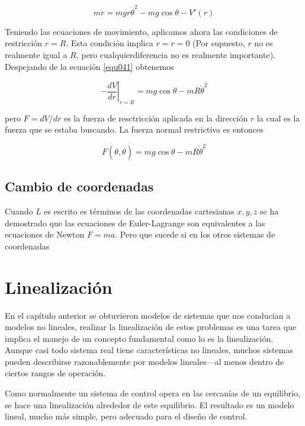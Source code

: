 \documentclass[12pt]{book}
\theoremstyle{definition}
\theoremstyle{remark}
\theoremstyle{plain}
\begin{document}
\begin{equation}
\label{equ041}
m \ddot{r} = m g r \dot{\theta}^2-m g \cos \theta - V'(r)
\end{equation}

Teniendo las ecuaciones de movimiento, aplicamos ahora las condiciones de restricción $r=R$. Esta condición implica $\dot{r}= \ddot{r}=0$  (Por supuesto, $r$ no es realmente igual a $R$, pero cualquierdiferencia no es realmente importante). Despejando de la ecuación \ref{equ041} obtenemos

\begin{equation}
\label{equ042}
\left . - \frac{d V}{d r}  \right | _{r=R} = m g \cos \theta - m R \dot{\theta}^2
\end{equation}

pero $ F = dV / d r$ es la fuerza de resctricción aplicada en la dirección $r$ la cual es la fuerza que se estaba buscando. La fuerza normal restrictiva es entonces

\begin{equation}
\label{equ043}
F (\theta, \dot{\theta} )= m g \cos \theta - m R \dot{\theta}^2
\end{equation}

\section{Cambio de coordenadas}

Cuando $L$ es escrito es términos de las coordenadas cartesianas $x,y,z$  se ha demostrado que las ecuaciones de Euler-Lagrange son equivalentes a las ecuaciones de Newton $F=m a$. Pero que sucede si en los otros sistemas de coordenadas



\chapter{Linealización}

En el capítulo anterior se obtuvieron modelos de sistemas que nos conducian a modelos no lineales, realizar la linealización de estos problemas es una tarea que implica el manejo de un concepto fundamental como lo es la linealización. Aunque casi todo sistema real tiene características no lineales, muchos sistemas pueden describirse razonablemente por modelos lineales—al menos dentro de ciertos rangos de operación.

Como normalmente un sistema de control opera en las cercanías de un equilibrio, se hace una linealización alrededor de este equilibrio. El resultado es un modelo lineal, mucho más simple, pero adecuado para el diseño de control.
\end{document}
